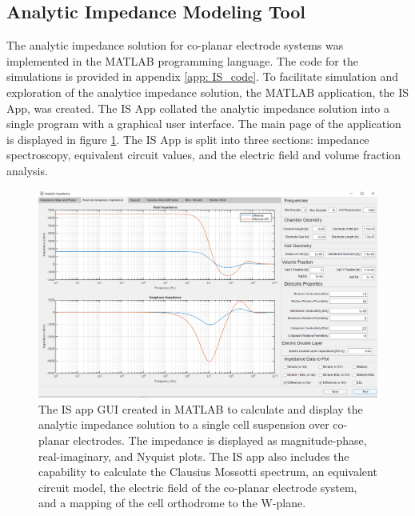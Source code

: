 


\subsection{Analytic Impedance Modeling Tool}

\par The analytic impedance solution for co-planar electrode systems was implemented in the MATLAB programming language. The code for the simulations is provided in appendix \ref{app: IS_code}. To facilitate simulation and exploration of the analytice impedance solution, the MATLAB application, the IS App, was created. The IS App collated the analytic impedance solution into a single program with a graphical user interface. The main page of the application is displayed in figure \ref{fig:matlab_IS_app}. The IS App is split into three sections: impedance spectroscopy, equivalent circuit values, and the electric field and volume fraction analysis. 

\begin{figure}[h]
    \centering
    \includegraphics[width=\textwidth]{images/analyticImpedanceApp.png}
    \caption[IS App]{The IS app GUI created in MATLAB to calculate and display the analytic impedance solution to a single cell suspension over co-planar electrodes. The impedance is displayed as magnitude-phase, real-imaginary, and Nyquist plots. The IS app also includes the capability to calculate the Clausius Mossotti spectrum, an equivalent circuit model, the electric field of the co-planar electrode system, and a mapping of the cell orthodrome to the W-plane.}
    \label{fig:matlab_IS_app}
\end{figure}

